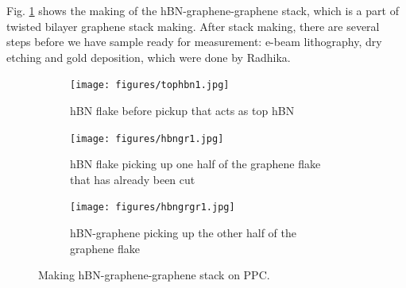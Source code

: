 Fig. \ref{fig:hbngrgr} shows the making of the hBN-graphene-graphene stack, which is a part of twisted bilayer graphene stack making. After stack making, there are several steps before we have sample ready for measurement: e-beam lithography, dry etching and gold deposition, which were done by Radhika.

\begin{figure}[H]
	\centering
	\begin{subfigure}[b]{0.6\textwidth}
		\centering
		\texttt{[image: figures/tophbn1.jpg]}
		\caption{hBN flake before pickup that acts as top hBN}
	\end{subfigure}
	\begin{subfigure}[b]{0.6\textwidth}
		\centering
		\texttt{[image: figures/hbngr1.jpg]}
		\caption{hBN flake picking up one half of the graphene flake that has already been cut}
	\end{subfigure}
	\begin{subfigure}[b]{0.6\textwidth}
		\centering
		\texttt{[image: figures/hbngrgr1.jpg]}
		\caption{hBN-graphene picking up the other half of the graphene flake}
	\end{subfigure}
	\caption{Making hBN-graphene-graphene stack on PPC.}
	\label{fig:hbngrgr}
\end{figure}
